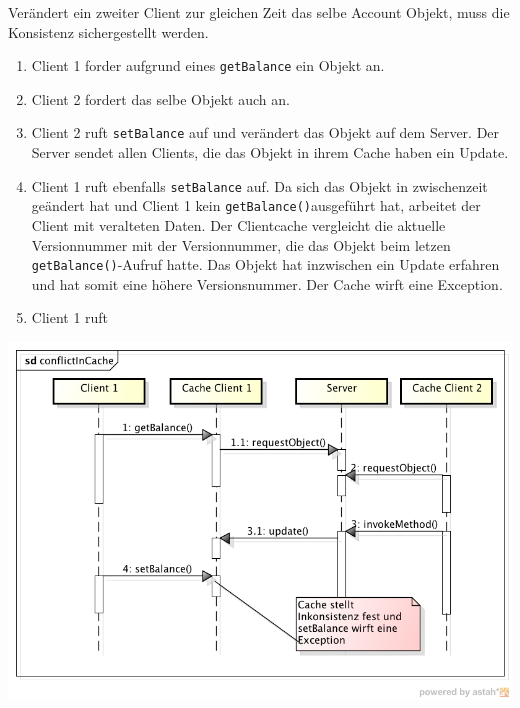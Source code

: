 Verändert ein zweiter Client zur gleichen Zeit das selbe Account Objekt, muss die Konsistenz sichergestellt werden. 
\begin{enumerate}
\item Client 1 forder aufgrund eines \verb|getBalance| ein Objekt an.
\item Client 2 fordert das selbe Objekt auch an.
\item Client 2 ruft \verb|setBalance| auf und verändert das Objekt auf dem Server. Der Server sendet allen Clients, die das Objekt in ihrem Cache haben ein Update.
\item Client 1 ruft ebenfalls \verb|setBalance| auf. Da sich das Objekt in zwischenzeit geändert hat und Client 1 kein \verb|getBalance()|ausgeführt hat, arbeitet der Client mit veralteten Daten. Der Clientcache vergleicht die aktuelle Versionnummer mit der Versionnummer, die das Objekt beim letzen \verb|getBalance()|-Aufruf hatte. Das Objekt hat inzwischen ein Update erfahren und hat somit eine höhere Versionsnummer. Der Cache wirft eine Exception.
\item Client 1 ruft 
\end{enumerate}

\includegraphics[scale=0.3]{images_objectcaching/conflictInCache}

